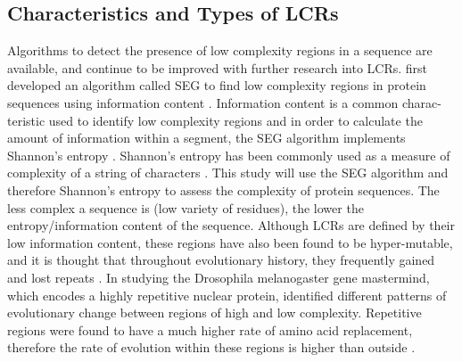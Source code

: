 \documentclass{article}
\begin{document}
\subsection{Characteristics and Types of LCRs}
Algorithms to detect the presence of low complexity regions in a sequence are available, and continue to be improved
with further research into LCRs. \citet{wootton1993statistics} first developed an algorithm called SEG to find low complexity
regions in protein sequences using information content \citep{huntley2002simple}. Information content is a common charac-
teristic used to identify low complexity regions and in order to calculate the amount of information within a segment, the SEG
algorithm implements Shannon’s entropy \citep{battistuzzi2016profiles, wootton1993statistics}. Shannon’s entropy \citep{shannon1948mathematical} has been commonly used as a measure of complexity of a string of characters \citep{battistuzzi2016profiles, coletta2010low, wootton1993statistics}. This study will use the SEG algorithm and therefore Shannon’s entropy to assess the complexity of protein sequences. The less complex a sequence is (low variety of residues), the lower the entropy/information content of the sequence. Although LCRs are defined by their low information content, these regions have also been found to be hyper-mutable, and it is thought that throughout evolutionary history, they frequently gained and lost repeats \citep{marcotte1999census, kruglyak1998equilibrium}. In studying the Drosophila melanogaster gene mastermind, which encodes a highly repetitive nuclear protein, \citet{newfeld1991interspecific} identified different patterns of evolutionary change between regions of high and low complexity. Repetitive regions were found to have a much higher rate of amino acid replacement, therefore the rate of evolution within these regions is higher than outside \citep{newfeld1991interspecific, huntley2000evolution}.
\end{document}
